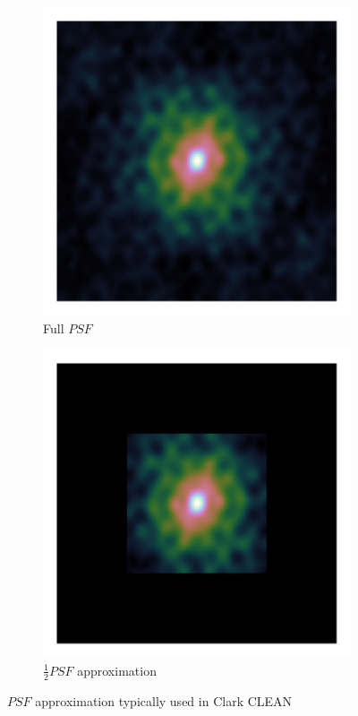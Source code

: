 \begin{figure}[h]
	\centering
	\begin{subfigure}[b]{0.245\linewidth}
		\includegraphics[width=\linewidth, clip, trim= 0.25in 0.25in 0.25in 0.25in]{./chapters/03.cd/simulated/psf.png}
		\caption{Full $PSF$}
	\end{subfigure}
	\begin{subfigure}[b]{0.245\linewidth}
		\includegraphics[width=\linewidth, clip, trim= 0.25in 0.25in 0.25in 0.25in]{./chapters/03.cd/simulated/psfCut.png}
		\caption{$\frac{1}{2}PSF$ approximation}
	\end{subfigure}
	\caption{$PSF$ approximation typically used in Clark CLEAN}
	\label{gradients:clark}
\end{figure}

